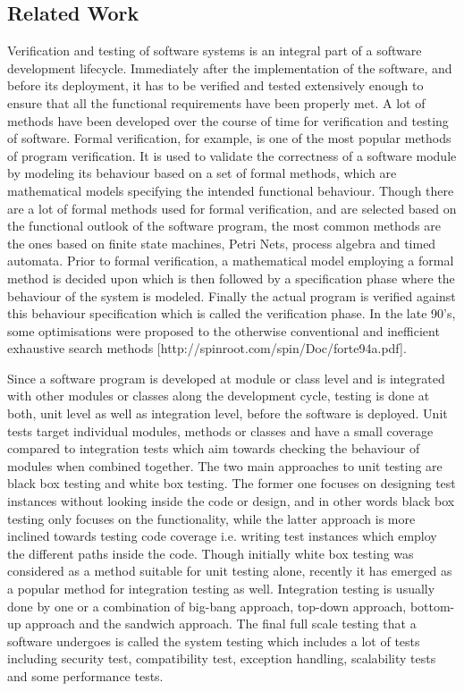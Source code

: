 \raggedbottom
\subsection{Related Work}

Verification and testing of software systems is an integral part of a software development lifecycle. Immediately after the implementation of the software, and before its deployment, it has to be verified and tested extensively enough to ensure that all the functional requirements have been properly met. A lot of methods have been developed over the course of time for verification and testing of software. Formal verification, for example, is one of the most popular methods of program verification. It is used to validate the correctness of a software module by modeling its behaviour based on a set of formal methods, which are mathematical models specifying the intended functional behaviour. Though there are a lot of formal methods used for formal verification, and are selected based on the functional outlook of the software program, the most common methods are the ones based on finite state machines, Petri Nets, process algebra and timed automata. Prior to formal verification, a mathematical model employing a formal method is decided upon which is then followed by a specification phase where the behaviour of the system is modeled. Finally the actual program is verified against this behaviour specification which is called the verification phase. In the late 90's, some optimisations were proposed to the otherwise conventional and inefficient exhaustive search methods [http://spinroot.com/spin/Doc/forte94a.pdf].

Since a software program is developed at module or class level and is integrated with other modules or classes along the development cycle, testing is done at both, unit level as well as integration level, before the software is deployed. Unit tests target individual modules, methods or classes and have a small coverage compared to integration tests which aim towards checking the behaviour of modules when combined together. The two main approaches to unit testing are black box testing and white box testing. The former one focuses on designing test instances without looking inside the code or design, and in other words black box testing only focuses on the functionality, while the latter approach is more inclined towards testing code coverage i.e. writing test instances which employ the different paths inside the code. Though initially white box testing was considered as a method suitable for unit testing alone, recently it has emerged as a popular method for integration testing as well. Integration testing is usually done by one or a combination of big-bang approach, top-down approach, bottom-up approach and the sandwich approach. The final full scale testing that a software undergoes is called the system testing which includes a lot of tests including security test, compatibility test, exception handling, scalability tests and some performance tests. 

